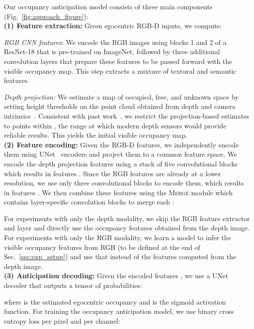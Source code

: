 \documentclass[runningheads]{llncs}
\begin{document}
Our occupancy anticipation model consists of three main components (Fig.~\ref{fig:approach_figure}): \\ 
\noindent\textbf{(1) Feature extraction:} Given egocentric RGB-D inputs, we compute: 

\noindent\emph{RGB CNN features:} We encode the RGB images using blocks 1 and 2 of a ResNet-18 that is pre-trained on ImageNet, followed by three additional convolution layers that prepare these features to be passed forward with the visible occupancy map. This step extracts a mixture of textural and semantic features.

\noindent\emph{Depth projection:} We estimate a map of occupied, free, and unknown space by setting height thresholds on the point cloud obtained from depth and camera intrinsics~\cite{chen2019learning}. Consistent with past work~\cite{chen2019learning,chaplot2020learning}, we restrict the projection-based estimates to points within , the range at which modern depth sensors would provide reliable results. This yields the initial visible occupancy map.\\

\noindent\textbf{(2) Feature encoding:} Given the RGB-D features, we independently encode them using UNet~\cite{ronneberger2015u} encoders and project them to a common feature space. We encode the depth projection features using a stack of five convolutional blocks which results in features . Since the RGB features are already at a lower resolution, we use only three convolutional blocks to encode them, which results in features . We then combine these features using the \textsc{Merge} module which contains layer-specific convolution blocks to merge each : 


For experiments with only the depth modality, we skip the RGB feature extractor and  layer and directly use the occupancy features obtained from the depth image. For experiments with only the RGB modality, we learn a model to infer the visible occupancy features from RGB (to be defined at the end of Sec.~\ref{sec:exp_setup}) and use that instead of the features computed from the depth image. \\


\noindent\textbf{(3) Anticipation decoding:}
Given the encoded features , we use a UNet decoder that outputs a  tensor of probabilities:
 
where  is the estimated egocentric occupancy and  is the sigmoid activation function. For training the occupancy anticipation model, we use binary cross entropy loss per pixel and per channel:
 
\end{document}
